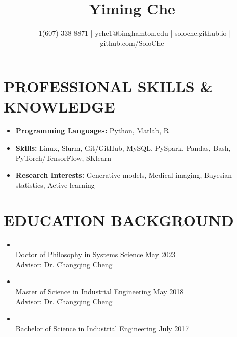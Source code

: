 \documentclass[10pt]{article}
\title{\bf  Yiming Che \vspace{-0.6em}}
\author{+1(607)-338-8871 | yche1@binghamton.edu | soloche.github.io | github.com/SoloChe}
\date{}
\begin{document}
	\maketitle

\vspace{-5em}

\section*{PROFESSIONAL SKILLS \& KNOWLEDGE}
 \begin{itemize}	
 	\item {\bf Programming Languages:} Python, Matlab, R
 	\item {\bf Skills:} Linux, Slurm, Git/GitHub, MySQL, PySpark, Pandas, Bash, PyTorch/TensorFlow, SKlearn
 	\item {\bf Research Interests:} Generative models, Medical imaging, Bayesian statistics, Active learning
 \end{itemize}

\section*{EDUCATION BACKGROUND}
\begin{itemize}
		\item {}                                                           
		\\Doctor of Philosophy in Systems Science \hfill May 2023 
		\\Advisor: Dr. Changqing Cheng

	\item {}                                                           
	\\Master of Science in Industrial Engineering \hfill  May 2018\\
	Advisor: Dr. Changqing Cheng
	
    \item {}
            \\Bachelor of Science in Industrial Engineering \hfill July 2017 
\end{itemize}
\end{document}
